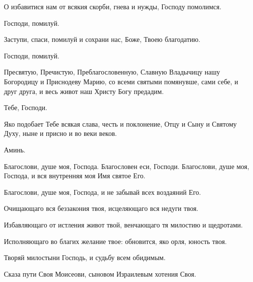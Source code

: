 \begin{mymulticols}
 О избавитися нам от всякия скорби, гнева и нужды, Господу помолимся. 

 Господи, помилуй.

 Заступи, спаси, помилуй и сохрани нас, Боже, Твоею благодатию. 

 Господи, помилуй.

 Пресвятую, Пречистую, Преблагословенную, Славную Владычицу нашу Богородицу и Приснодеву Марию, со всеми святыми помянувше, сами себе, и друг друга, и весь живот наш Христу Богу предадим. 

 Тебе, Господи. 

 Яко подобает Тебе всякая слава, честь и поклонение, Отцу и Сыну и Святому Духу, ныне и присно и во веки веков. 

 Аминь.




 Благослови, душе моя, Господа. Благословен еси, Господи. Благослови, душе моя, Господа, и вся внутренняя моя Имя святое Его. 

 Благослови, душе моя, Господа, и не забывай всех воздаяний Его. 

 Очищающаго вся беззакония твоя,  исцеляющаго вся недуги твоя. 

 Избавляющаго от истления живот твой,  венчающаго тя милостию и щедротами. 

 Исполняющаго во благих желание твое:  обновится, яко орля, юность твоя. 

 Творяй милостыни Господь, и судьбу всем обидимым. 

 Сказа пути Своя Моисеови, сыновом Израилевым хотения Своя. 


\end{mymulticols}

